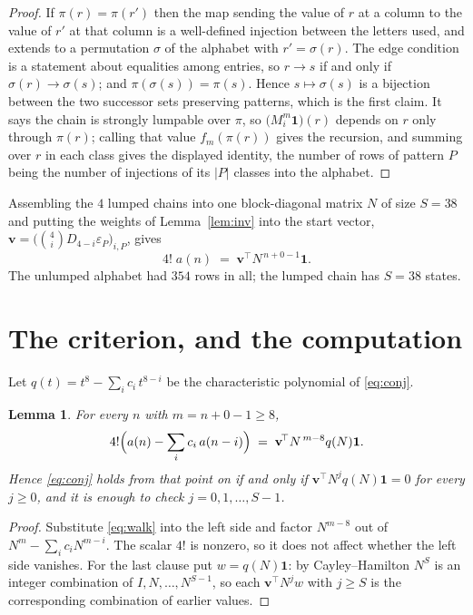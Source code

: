 \documentclass[11pt,a4paper]{article}
\theoremstyle{plain}
\newtheorem{lemma}[theorem]{Lemma}
\theoremstyle{definition}
\begin{document}
\begin{proof}
If $\pi(r)=\pi(r')$ then the map sending the value of $r$ at a column to the value of $r'$
at that column is a well-defined injection between the letters used, and extends to a
permutation $\sigma$ of the alphabet with $r'=\sigma(r)$. The edge condition is a statement
about equalities among entries, so $r\to s$ if and only if $\sigma(r)\to\sigma(s)$; and
$\pi(\sigma(s))=\pi(s)$. Hence $s\mapsto\sigma(s)$ is a bijection between the two successor
sets preserving patterns, which is the first claim. It says the chain is strongly lumpable
over $\pi$, so $\bigl(M_i^{m}\mathbf{1}\bigr)(r)$ depends on $r$ only through $\pi(r)$;
calling that value $f_m(\pi(r))$ gives the recursion, and summing over $r$ in each class
gives the displayed identity, the number of rows of pattern $P$ being the number of
injections of its $|P|$ classes into the alphabet.
\end{proof}

Assembling the $4$ lumped chains into one block-diagonal matrix $N$ of size $S=38$ and
putting the weights of Lemma~\ref{lem:inv} into the start vector,
$\mathbf{v}=\bigl(\binom{4}{i}D_{4-i}\varepsilon_P\bigr)_{i,P}$, gives
\begin{equation}\label{eq:walk}
4!\;a(n)\;=\;\mathbf{v}^{\!\top}N^{\,n+0-1}\mathbf{1} .
\end{equation}
The unlumped alphabet had $354$ rows in all; the lumped chain has $S=38$ states.

\section{The criterion, and the computation}

Let $q(t)=t^{8}-\sum_i c_i\,t^{8-i}$ be the characteristic polynomial of
\eqref{eq:conj}.

\begin{lemma}\label{lem:crit}
For every $n$ with $m=n+0-1\ge8$,
\[
4!\Bigl(a(n)-\sum_i c_i\,a(n-i)\Bigr)\;=\;\mathbf{v}^{\!\top}N^{\,m-8}q(N)\mathbf{1} .
\]
Hence \eqref{eq:conj} holds from that point on if and only if
$\mathbf{v}^{\!\top}N^{j}q(N)\mathbf{1}=0$ for every $j\ge0$, and it is enough to check
$j=0,1,\dots,S-1$.
\end{lemma}

\begin{proof}
Substitute \eqref{eq:walk} into the left side and factor $N^{m-8}$ out of
$N^{m}-\sum_i c_iN^{m-i}$. The scalar $4!$ is nonzero, so it does not affect whether
the left side vanishes. For the last clause put $w=q(N)\mathbf{1}$: by Cayley--Hamilton
$N^{S}$ is an integer combination of $I,N,\dots,N^{S-1}$, so each
$\mathbf{v}^{\!\top}N^{j}w$ with $j\ge S$ is the corresponding combination of earlier
values.
\end{proof}
\end{document}
